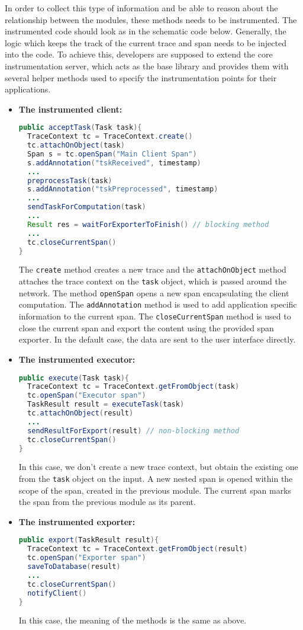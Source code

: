 In order to collect this type of information and be able to reason about the relationship between the modules, these methods needs to be instrumented. The instrumented code should look as in the schematic code below. Generally, the logic which keeps the track of the current trace and span needs to be injected into the code. To achieve this, developers are supposed to extend the core instrumentation server, which acts as the base library and provides them with several helper methods used to specify the instrumentation points for their applications. 

\begin{itemize}
\item \textbf{The instrumented client:}
\begin{lstlisting}[language=Java]
public acceptTask(Task task){
  TraceContext tc = TraceContext.create()
  tc.attachOnObject(task)
  Span s = tc.openSpan("Main Client Span")	
  s.addAnnotation("tskReceived", timestamp)
  ...
  preprocessTask(task)
  s.addAnnotation("tskPreprocessed", timestamp)
  ...
  sendTaskForComputation(task)
  ...
  Result res = waitForExporterToFinish() // blocking method
  ...
  tc.closeCurrentSpan()
}
\end{lstlisting}
The \texttt{create} method creates a new trace and the \texttt{attachOnObject} method attaches the trace context on the \texttt{task} object, which is passed around the network. The method \texttt{openSpan} opens a new span encapsulating the client computation. The \texttt{addAnnotation} method is used to add application specific information to the current span. The \texttt{closeCurrentSpan} method is used to close the current span and export the content using the provided span exporter. In the default case, the data are sent to the user interface directly.


\item \textbf{The instrumented executor:}
\begin{lstlisting}[language=Java]
public execute(Task task){
  TraceContext tc = TraceContext.getFromObject(task)
  tc.openSpan("Executor span")
  TaskResult result = executeTask(task)
  tc.attachOnObject(result)
  ...
  sendResultForExport(result) // non-blocking method
  tc.closeCurrentSpan()
}
\end{lstlisting}
In this case, we don't create a new trace context, but obtain the existing one from the \texttt{task} object on the input. A new nested span is opened within the scope of the span, created in the previous module. The current span marks the span from the previous module as its parent.

\item \textbf{The instrumented exporter:}
\begin{lstlisting}[language=Java]
public export(TaskResult result){
  TraceContext tc = TraceContext.getFromObject(result)
  tc.openSpan("Exporter span")
  saveToDatabase(result)
  ...
  tc.closeCurrentSpan()
  notifyClient()	
}
\end{lstlisting}
In this case, the meaning of the methods is the same as above.

\end{itemize}


